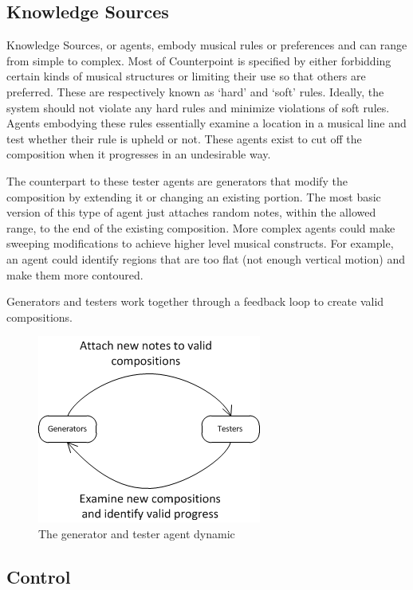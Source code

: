 \subsection{Knowledge Sources} %

Knowledge Sources, or agents, embody musical rules or preferences and can range from simple to complex.
Most of Counterpoint is specified by either forbidding certain kinds of musical structures or limiting their use so that others are preferred.
These are respectively known as `hard' and `soft' rules. Ideally, the system should not violate any hard rules and minimize violations of soft rules.
Agents embodying these rules essentially examine a location in a musical line and test whether their rule is upheld or not.
These agents exist to cut off the composition when it progresses in an undesirable way.

The counterpart to these tester agents are generators that modify the composition by extending it or changing an existing portion.
The most basic version of this type of agent just attaches random notes, within the allowed range, to the end of the existing composition.
More complex agents could make sweeping modifications to achieve higher level musical constructs.
For example, an agent could identify regions that are too flat (not enough vertical motion) and make them more contoured.

Generators and testers work together through a feedback loop to create valid compositions.

\begin{figure}[h]
\centering
	\includegraphics[keepaspectratio=true]{generator-and-tester-dynamic.png}
\caption{The generator and tester agent dynamic}
\end{figure}

\subsection{Control} %


